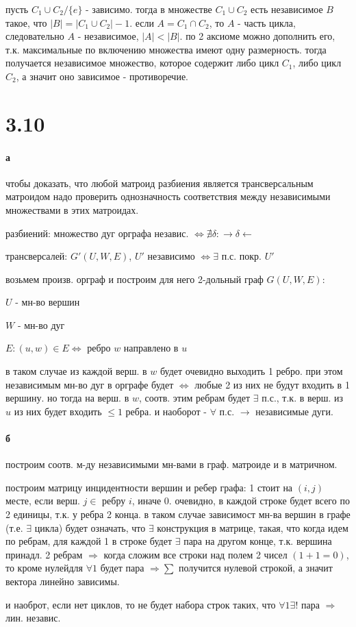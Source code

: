 \documentclass[russian]{article}
\begin{document}
пусть $C_1 \cup C_2 / \{e\}$ - зависимо. тогда в множестве $C_1 \cup C_2$ есть независимое $B$ такое, что $|B|=|C_1 \cup C_2| - 1$. если $A=C_1 \cap C_2$, то $A$ - часть цикла, следовательно $A$ - независимое, $|A| < |B|$. по 2 аксиоме можно дополнить его, т.к. максимальные по включению множества имеют одну размерность. тогда получается независимое множество, которое содержит либо цикл $C_1$, либо цикл $C_2$, а значит оно зависимое - противоречие.

\section*{3.10}

\paragraph{а}

чтобы доказать, что любой матроид разбиения является трансверсальным матроидом надо проверить однозначность соответствия между независимыми множествами в этих матроидах. 

разбиений: множество дуг орграфа независ. $\iff \nexists \delta : \to \delta \leftarrow$

трансверсалей: $G'(U,W,E)$, $U'$ независимо $\iff \exists $ п.с. покр. $U'$

возьмем произв. орграф и построим для него 2-дольный граф $G(U,W,E)$:

$U$ - мн-во вершин

$W$ - мн-во дуг

$E:(u,w) \in E \iff $ ребро $w$ направлено в $u$

в таком случае из каждой верш. в $w$ будет очевидно выходить 1 ребро. при этом независимым мн-во дуг в орграфе будет $\iff$ любые 2 из них не будут входить в 1 вершину. но тогда на верш. в $w$, соотв. этим ребрам будет $\exists$ п.с., т.к. в верш. из $u$ из них будет входить $\le 1$ ребра. и наоборот - $\forall$ п.с. $\to$ независимые дуги.

\paragraph{б}

построим соотв. м-ду независимыми мн-вами в граф. матроиде и в матричном.

построим матрицу инцидентности вершин и ребер графа: 1 стоит на $(i,j)$ месте, если верш. $j \in $ ребру $i$, иначе 0. очевидно, в каждой строке будет всего по 2 единицы, т.к. у ребра 2 конца. в таком случае зависимост мн-ва вершин в графе (т.е. $\exists$ цикла) будет означать, что $\exists$ конструкция в матрице, такая, что когда идем по ребрам, для каждой 1 в строке будет $\exists$ пара на другом конце, т.к. вершина принадл. 2 ребрам $\Rightarrow$ когда сложим все строки над полем 2 чисел $(1+1=0)$, то  кроме нулейдля $\forall 1$ будет пара $\Rightarrow \sum$ получится нулевой строкой, а значит вектора линейно зависимы.

и наоброт, если нет циклов, то не будет набора строк таких, что $\forall 1 \exists ! $ пара $\Rightarrow $ лин. независ.
\end{document}
